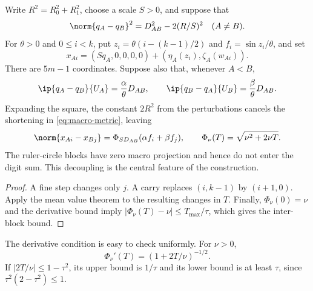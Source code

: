 Write $R^2=R_0^2+R_1^2$, choose a scale $S>0$, and suppose that
\begin{equation}\label{eq:macro-metric}
 \norm{q_A-q_B}^2=D_{AB}^2-2(R/S)^2\quad(A\ne B).
\end{equation}
For $\theta>0$ and $0\le i<k$, put
$z_i=\theta(i-(k-1)/2)$ and $f_i=\sin z_i/\theta$, and set
\begin{equation}\label{eq:points}
 x_{Ai}=(Sq_A,0,0,0,0)+(\eta_A(z_i),\zeta_A(w_{Ai})).
\end{equation}
There are $5m-1$ coordinates. Suppose also that, whenever $A<B$,
\[
 \ip{q_A-q_B}{U_A}=\frac{\alpha}{\theta}D_{AB},\qquad
 \ip{q_B-q_A}{U_B}=\frac{\beta}{\theta}D_{AB}.
\]
Expanding the square, the constant $2R^2$ from the perturbations cancels
the shortening in \eqref{eq:macro-metric}, leaving
\begin{equation}\label{eq:cross-general}
 \norm{x_{Ai}-x_{Bj}}=\Phi_{SD_{AB}}(\alpha f_i+\beta f_j),
 \qquad \Phi_\nu(T)=\sqrt{\nu^2+2\nu T}.
\end{equation}
The ruler-circle blocks have zero macro projection and hence do not enter
the digit sum. This decoupling is the central feature of the construction.

\begin{proof}
A fine step changes only $j$. A carry replaces $(i,k-1)$ by $(i+1,0)$.
Apply the mean value theorem to the resulting changes in $T$. Finally,
$\Phi_\nu(0)=\nu$ and the derivative bound imply
$|\Phi_\nu(T)-\nu|\le T_{\max}/\tau$, which gives the inter-block bound.
\end{proof}

The derivative condition is easy to check uniformly. For $\nu>0$,
\[
 \Phi_\nu'(T)=(1+2T/\nu)^{-1/2}.
\]
If $|2T/\nu|\le1-\tau^2$, its upper bound is $1/\tau$ and its lower
bound is at least $\tau$, since $\tau^2(2-\tau^2)\le1$.

